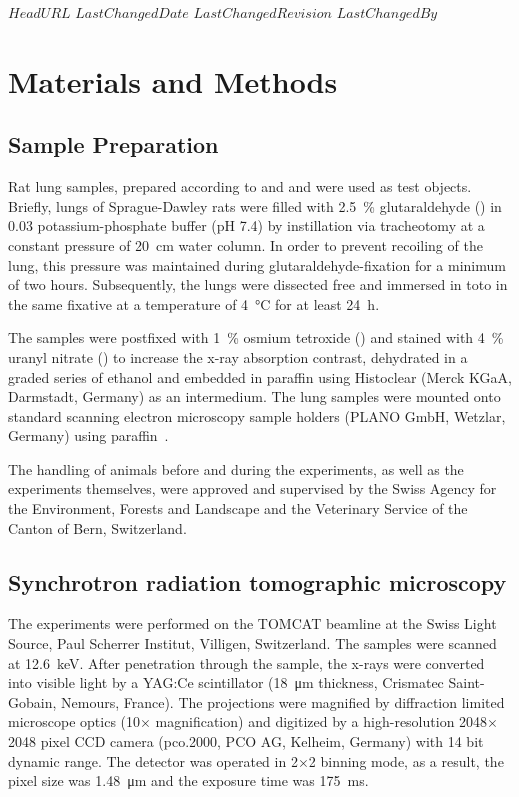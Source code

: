 \svnidlong
{$HeadURL$}
{$LastChangedDate$}
{$LastChangedRevision$}
{$LastChangedBy$}
%
\section{Materials and Methods}\label{sec:materials and methods}
\subsection{Sample Preparation}
Rat lung samples, prepared according to
\ifhtml
	\citet{Tschanz2002} and \citet{Luyet2002}
\else
	 and 
\fi
were used as test objects. Briefly, lungs of Sprague-Dawley rats were filled with \SI{2.5}{\percent} glutaraldehyde () in \SI{0.03}{\Molar} potassium-phosphate buffer (pH 7.4) by instillation via tracheotomy at a constant pressure of \SI{20}{\centi\meter} water column. In order to prevent recoiling of the lung, this pressure was maintained during glutaraldehyde-fixation for a minimum of two hours. Subsequently, the lungs were dissected free and immersed in toto in the same fixative at a temperature of \SI{4}{\celsius} for at least \SI{24}{\hour}.

The samples were postfixed with \SI{1}{\percent} osmium tetroxide () and stained with \SI{4}{\percent} uranyl nitrate () to increase the x-ray absorption contrast, dehydrated in a graded series of ethanol and embedded in paraffin using Histoclear (Merck KGaA, Darmstadt, Germany) as an intermedium. The lung samples were mounted onto standard scanning electron microscopy sample holders (PLANO GmbH, Wetzlar, Germany) using paraffin~\cite{Tsuda2008}.

The handling of animals before and during the experiments, as well as the experiments themselves, were approved and supervised by the Swiss Agency for the Environment, Forests and Landscape and the Veterinary Service of the Canton of Bern, Switzerland.

\subsection{Synchrotron radiation tomographic microscopy}
The experiments were performed on the TOMCAT beamline at the Swiss Light Source, Paul Scherrer Institut, Villigen, Switzerland. The samples were scanned at \SI{12.6}{\kilo\electronvolt}. After penetration through the sample, the x-rays were converted into visible light by a YAG:Ce scintillator (\SI{18}{\micro\meter} thickness, Crismatec Saint-Gobain, Nemours, France). The projections were magnified by diffraction limited microscope optics (10$\times$ magnification) and digitized by a high-resolution 2048$\times$2048 pixel CCD camera (pco.2000, PCO AG, Kelheim, Germany) with 14 bit dynamic range. The detector was operated in 2$\times$2 binning mode, as a result, the pixel size was \SI{1.48}{\micro\meter} and the exposure time was \SI{175}{\milli\second}.

